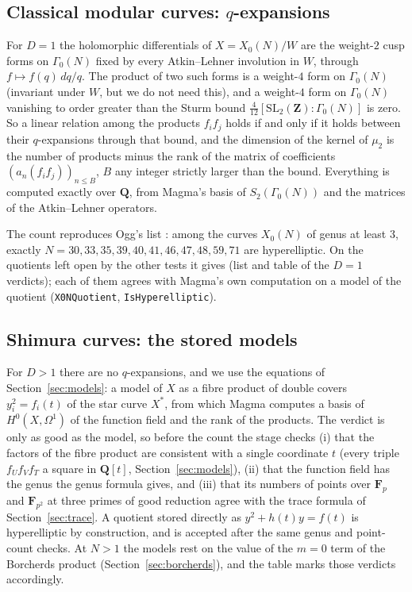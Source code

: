 \subsection{Classical modular curves: $q$-expansions}

For $D = 1$ the holomorphic differentials of $X = X_0(N)/W$ are the weight-$2$ cusp forms on
$\Gamma_0(N)$ fixed by every Atkin--Lehner involution in $W$, through $f \mapsto f(q)\,dq/q$. The
product of two such forms is a weight-$4$ form on $\Gamma_0(N)$ (invariant under $W$, but we do
not need this), and a weight-$4$ form on $\Gamma_0(N)$ vanishing to order greater than the Sturm
bound $\tfrac{4}{12}[\mathrm{SL}_2(\mathbf{Z}) : \Gamma_0(N)]$ is zero. So a linear relation among
the products $f_if_j$ holds if and only if it holds between their $q$-expansions through that bound,
and the dimension of the kernel of $\mu_2$ is the number of products minus the rank of the matrix of
coefficients $(a_n(f_if_j))_{n \le B}$, $B$ any integer strictly larger than the bound. Everything
is computed exactly over $\mathbf{Q}$, from Magma's basis of $S_2(\Gamma_0(N))$ and the matrices of
the Atkin--Lehner operators.

The count reproduces Ogg's list \cite{Ogg74}: among the curves $X_0(N)$ of genus at least $3$,
exactly $N = 30, 33, 35, 39, 40, 41, 46, 47, 48, 59, 71$ are hyperelliptic. On the quotients left
open by the other tests it gives (list and table of the $D = 1$ verdicts); each of them agrees with
Magma's own computation on a model of the quotient (\texttt{X0NQuotient}, \texttt{IsHyperelliptic}).

\subsection{Shimura curves: the stored models}

For $D > 1$ there are no $q$-expansions, and we use the equations of
Section~\ref{sec:models}: a model of $X$ as a fibre product of double covers
$y_i^2 = f_i(t)$ of the star curve $X^*$, from which Magma computes a basis of
$H^0(X,\Omega^1)$ of the function field and the rank of the products. The verdict is only as good
as the model, so before the count the stage checks (i) that the factors of the fibre product are
consistent with a single coordinate $t$ (every triple $f_Uf_Vf_T$ a square in $\mathbf{Q}[t]$,
Section~\ref{sec:models}), (ii) that the function field has the genus the genus formula gives,
and (iii) that its numbers of points over $\mathbf{F}_p$ and $\mathbf{F}_{p^2}$ at three primes of
good reduction agree with the trace formula of Section~\ref{sec:trace}. A quotient stored directly as
$y^2 + h(t)y = f(t)$ is hyperelliptic by construction, and is accepted after the same genus and
point-count checks. At $N > 1$ the models rest on the value of the $m = 0$ term of the Borcherds
product (Section~\ref{sec:borcherds}), and the table marks those verdicts accordingly.

